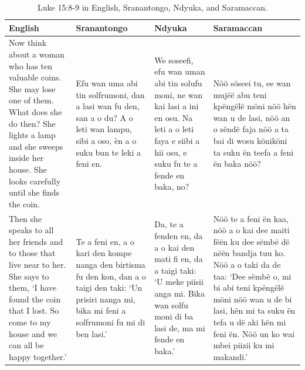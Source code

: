 \begin{table}[h!]
    \centering
    \begin{tabularx}{\textwidth}{XXXX}
    \hline
        \textbf{English}     &
        \textbf{Sranantongo} &
        \textbf{Ndyuka}      &
        \textbf{Saramaccan}  \\
    \hline
        Now think about a woman who has ten valuable coins. She may lose one of them. What does she do then? She lights a lamp and she sweeps inside her house. She looks carefully until she finds the coin. &
        Efu wan uma abi tin solfrumoni, dan a lasi wan fu den, san a o du? A o leti wan lampu, sibi a oso, èn a o suku bun te leki a feni en. &
        We soseefi, efu wan uman abi tin solufu moni, ne wan kai lasi a ini en osu. Na leti a o leti faya e siibi a hii osu, e suku fu te a fende en baka, no? &
        Nöö söseei tu, ee wan mujëë abu teni kpëngëlë möni nöö hën wan u de lasi, nöö an o sëndë faja nöö a ta bai di wosu köniköni ta suku ën teefa a feni ën baka nöö? \\
        Then she speaks to all her friends and to those that live near to her. She says to them, `I have found the coin that I lost. So come to my house and we can all be happy together.' &
        Te a feni en, a o kari den kompe nanga den birtisma fu den kon, dan a o taigi den taki: `Un prisiri nanga mi, bika mi feni a solfrumoni fu mi di ben lasi.' &
        Da, te a fenden en, da a o kai den mati fi en, da a taigi taki: `U meke piisii anga mi. Bika wan solfu moni di ba lasi de, ma mi fende en baka.' &
        Nöö te a feni ën kaa, nöö a o kai dee maiti fëën ku dee sëmbë dë nëën bandja tuu ko. Nöö a o taki da de taa: `Dee sëmbë o, mi bi abi teni kpëngëlë möni nöö wan u de bi lasi, hën mi ta suku ën tefa u dë aki hën mi feni ën. Nöö un ko wai mbei piizii ku mi makandi.'\\
    \hline
    \end{tabularx}\caption{Luke 15:8-9 in English, Sranantongo, Ndyuka, and Saramaccan.}
\end{table}
